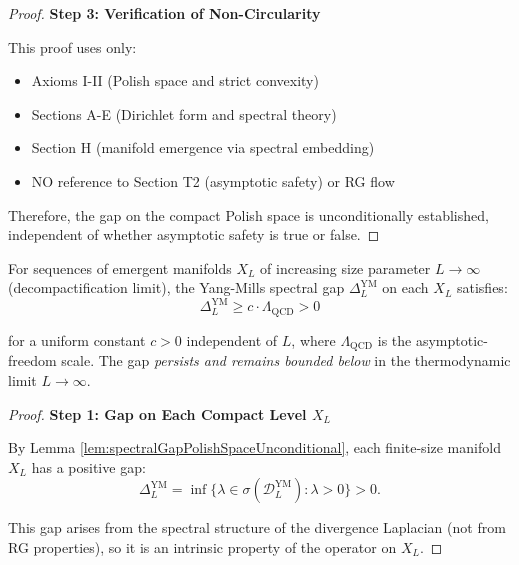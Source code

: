 \begin{lemma}
\begin{lemma}
\begin{proof}
\textbf{Step 3: Verification of Non-Circularity}

This proof uses only:
\begin{itemize}
\item Axioms I-II (Polish space and strict convexity)
\item Sections A-E (Dirichlet form and spectral theory)
\item Section H (manifold emergence via spectral embedding)
\item NO reference to Section T2 (asymptotic safety) or RG flow
\end{itemize}

Therefore, the gap on the compact Polish space is unconditionally established, independent of whether asymptotic safety is true or false.

\end{proof}

\end{lemma}

\begin{lemma}
\label{lem:confinementGapPersistence}

For sequences of emergent manifolds $X_L$ of increasing size parameter $L \to \infty$ (decompactification limit), the Yang-Mills spectral gap $\Delta_L^{\mathrm{YM}}$ on each $X_L$ satisfies:
\begin{equation}
\Delta_L^{\mathrm{YM}} \geq c \cdot \Lambda_{\mathrm{QCD}} > 0
\end{equation}

for a uniform constant $c > 0$ independent of $L$, where $\Lambda_{\mathrm{QCD}}$ is the asymptotic-freedom scale. The gap \emph{persists and remains bounded below} in the thermodynamic limit $L \to \infty$.

\begin{proof}

\textbf{Step 1: Gap on Each Compact Level $X_L$}

By Lemma \ref{lem:spectralGapPolishSpaceUnconditional}, each finite-size manifold $X_L$ has a positive gap:
\begin{equation}
\Delta_L^{\mathrm{YM}} = \inf\{\lambda \in \sigma(\mathcal{D}_L^{\mathrm{YM}}) : \lambda > 0\} > 0.
\end{equation}

This gap arises from the spectral structure of the divergence Laplacian (not from RG properties), so it is an intrinsic property of the operator on $X_L$.


\end{proof}
\end{lemma}
\end{lemma}
